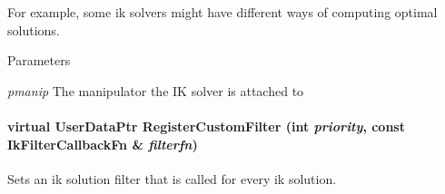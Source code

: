 For example, some ik solvers might have different ways of computing optimal solutions. 
\begin{DoxyParams}{Parameters}
\item[{\em pmanip}]The manipulator the IK solver is attached to \end{DoxyParams}
\hypertarget{classOpenRAVE_1_1IkSolverBase_a9ac28a8ef0d2511ea4a7e89e81ad013d}{
\paragraph[{RegisterCustomFilter}]{\setlength{\rightskip}{0pt plus 5cm}virtual UserDataPtr RegisterCustomFilter (int {\em priority}, \/  const {\bf IkFilterCallbackFn} \& {\em filterfn})}\hfill}
\label{classOpenRAVE_1_1IkSolverBase_a9ac28a8ef0d2511ea4a7e89e81ad013d}


Sets an ik solution filter that is called for every ik solution. 

